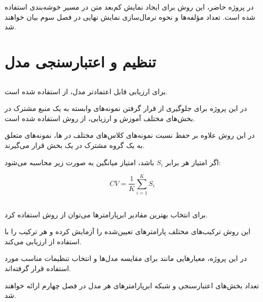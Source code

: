 در پروژه حاضر، این روش برای ایجاد نمایش کم‌بعد متن در مسیر خوشه‌بندی استفاده شده است. تعداد مؤلفه‌ها و نحوه نرمال‌سازی نمایش نهایی در فصل سوم بیان خواهند شد.


\section{تنظیم و اعتبارسنجی مدل}


\subsection{}

برای ارزیابی قابل اعتمادتر مدل، از
استفاده شده است.

در این پروژه برای جلوگیری از قرار گرفتن نمونه‌های وابسته به یک منبع مشترک در بخش‌های مختلف آموزش و ارزیابی، از روش
استفاده شده است.

در این روش علاوه بر حفظ نسبت نمونه‌های کلاس‌های مختلف در
ها، نمونه‌های متعلق به یک گروه مشترک در یک بخش قرار می‌گیرند.

اگر امتیاز هر
برابر $S_i$ باشد، امتیاز میانگین به صورت زیر محاسبه می‌شود:

\begin{equation}
CV
=
\frac{1}{K}
\sum_{i=1}^{K}
S_i
\end{equation}


\subsection{}

برای انتخاب بهترین مقادیر ابرپارامترها می‌توان از روش
استفاده کرد.

این روش ترکیب‌های مختلف پارامترهای تعیین‌شده را آزمایش کرده و هر ترکیب را با استفاده از
ارزیابی می‌کند.

در این پروژه، معیارهایی مانند
برای مقایسه مدل‌ها و انتخاب تنظیمات مناسب مورد استفاده قرار گرفته‌اند.

تعداد بخش‌های اعتبارسنجی و شبکه ابرپارامترهای هر مدل در فصل چهارم ارائه خواهند شد.

